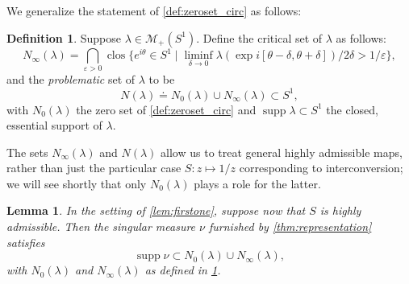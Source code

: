 \documentclass{cams-l} %
\newcommand{\dave}[1]{#1}\newcommand{\davebegin}{}\newcommand{\daveend}{}\newcommand{\george}[1]{#1}
\newcommand{\cM}{\mathcal M}
\newcommand{\eps}{\varepsilon}
\newcommand{\op}{\operatorname}
\newcommand{\supp}{\operatorname{supp}}
\newtheorem{lemma}[theorem]{Lemma}
\theoremstyle{definition}
\newtheorem{definition}[theorem]{Definition}
\theoremstyle{remark}
\numberwithin{equation}{section}
\begin{document}
We generalize \dave{the statement of} \cref{def:zeroset_circ} as follows:
\begin{definition}\label{def:problematic_circ}
    Suppose $\lambda\in\cM_+(S^1)$. Define the critical set of $\lambda$ as follows:
    \[N_{\infty}(\lambda) = \bigcap_{\eps>0}\op{clos}\Big\{e^{i\theta}\in S^1\;\Big|\;\liminf_{\delta\to 0}\lambda(\exp i[\theta-\delta,\theta+\delta])/2\delta > 1/\eps\Big\},\]
    \dave{and the \emph{problematic} set of $\lambda$ to be 
    \[N(\lambda)\doteq N_0(\lambda)\cup N_\infty(\lambda)\subset S^1,\]
    with $N_0(\lambda)$ the zero set of \cref{def:zeroset_circ} and $\supp\lambda\subset S^1$ the closed, essential support of $\lambda$}.
\end{definition}
The sets $N_\infty(\lambda)$ and $N(\lambda)$ allow us to treat general highly admissible maps, rather than just the particular case $S:z\mapsto 1/z$ corresponding to interconversion; we will see shortly that only $N_0(\lambda)$ plays a role for the latter.
\begin{lemma}\label{lem:containment}
    In the setting of \cref{lem:firstone}, suppose now that $S$ is highly admissible. Then the singular measure $\nu$ furnished by \cref{thm:representation} satisfies
    \[\supp \nu\subset N_0(\lambda)\cup N_\infty(\lambda),\]
    with $N_0(\lambda)$ and $N_\infty(\lambda)$ as defined in \cref{def:problematic_circ}.
\end{lemma}
\end{document}

